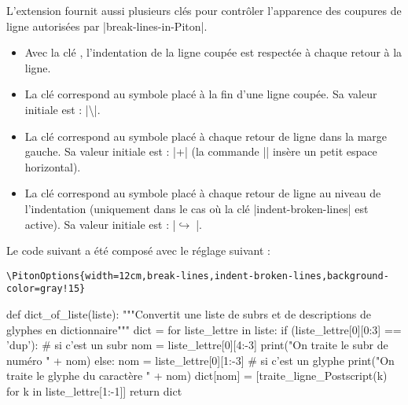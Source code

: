 \documentclass[dvipsnames,svgnames]{article}
\begin{document}
\medskip
L'extension  fournit aussi plusieurs clés pour contrôler l'apparence des coupures de ligne autorisées par |break-lines-in-Piton|.

\begin{itemize}
\item {} Avec la clé , l'indentation de la ligne coupée est respectée à chaque retour
à la ligne. 

\item {} La clé  correspond au symbole placé à la fin d'une ligne coupée. Sa valeur initiale est : 
|\hspace*{0.5em}\textbackslash|.

\item {} La clé  correspond au symbole placé à chaque retour de ligne dans la marge
gauche. Sa valeur initiale est : |+\;| (la commande |\;| insère un petit espace horizontal). 

\item {} La clé  correspond au symbole placé à chaque retour de ligne
au niveau de l'indentation (uniquement dans le cas où la clé |indent-broken-lines| est active). Sa valeur initiale
est : |$\hookrightarrow\;$|.
\end{itemize}

\bigskip
Le code suivant a été composé avec le réglage suivant :  

\begin{Verbatim}
\PitonOptions{width=12cm,break-lines,indent-broken-lines,background-color=gray!15}
\end{Verbatim}

\begin{center}
\begin{Piton}
def dict_of_liste(liste):
    """Convertit une liste de subrs et de descriptions de glyphes en dictionnaire"""
    dict = {}
    for liste_lettre in liste:
        if (liste_lettre[0][0:3] == 'dup'): # si c'est un subr
            nom = liste_lettre[0][4:-3]
            print("On traite le subr de numéro " + nom)
        else:
            nom = liste_lettre[0][1:-3] # si c'est un glyphe
            print("On traite le glyphe du caractère " + nom)
        dict[nom] = [traite_ligne_Postscript(k) for k in liste_lettre[1:-1]]
    return dict
\end{Piton}
\end{center}
\end{document}
